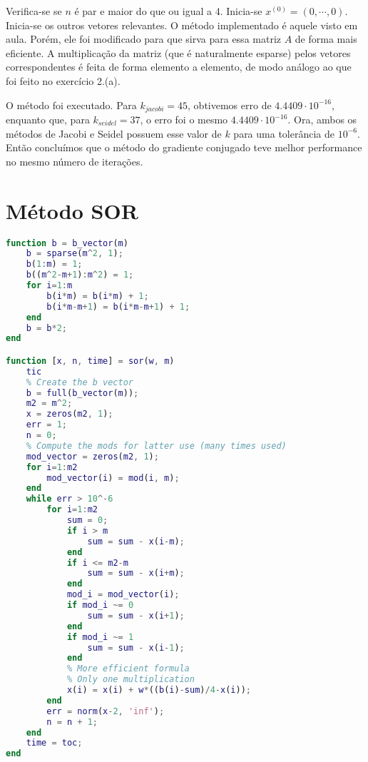 \documentclass{article}
\begin{document}
\begin{enumerate}
\begin{enumerate}
                    Verifica-se se $n$ é par e maior do que ou igual a 4.
                    Inicia-se $x^{(0)} = (0, \cdots, 0)$. Inicia-se os outros vetores
                    relevantes. O método implementado é aquele visto em aula.
                    Porém, ele foi modificado para que sirva para essa matriz $A$ de forma mais eficiente.
                    A multiplicação da matriz (que é naturalmente esparse) pelos vetores correspondentes é 
                    feita de forma elemento a elemento, de modo análogo ao que foi feito
                    no exercício 2.(a).

                    O método foi executado. Para $k_{jacobi} = 45$, obtivemos erro de $4.4409\cdot 10^{-16}$,
                    enquanto que, para $k_{seidel} = 37$, o erro foi o mesmo $4.4409\cdot 10^{-16}$. Ora, ambos os métodos
                    de Jacobi e Seidel possuem esse valor de $k$ para uma tolerância de $10^{-6}$. Então concluímos que
                    o método do gradiente conjugado teve melhor performance no mesmo número de iterações.
            \end{enumerate}

    \end{enumerate}

    \appendix

    \section{Método SOR}
        \label{appendix:a}

        \begin{lstlisting}[language=Matlab]
function b = b_vector(m)
    b = sparse(m^2, 1);
    b(1:m) = 1;
    b((m^2-m+1):m^2) = 1;
    for i=1:m
        b(i*m) = b(i*m) + 1;
        b(i*m-m+1) = b(i*m-m+1) + 1;
    end
    b = b*2;
end        

function [x, n, time] = sor(w, m)
    tic
    % Create the b vector
    b = full(b_vector(m));
    m2 = m^2;
    x = zeros(m2, 1);
    err = 1;
    n = 0;
    % Compute the mods for latter use (many times used)
    mod_vector = zeros(m2, 1);
    for i=1:m2
        mod_vector(i) = mod(i, m);
    end
    while err > 10^-6
        for i=1:m2
            sum = 0;
            if i > m
                sum = sum - x(i-m);
            end
            if i <= m2-m
                sum = sum - x(i+m);
            end
            mod_i = mod_vector(i);
            if mod_i ~= 0
                sum = sum - x(i+1);
            end
            if mod_i ~= 1
                sum = sum - x(i-1);
            end
            % More efficient formula
            % Only one multiplication
            x(i) = x(i) + w*((b(i)-sum)/4-x(i));
        end
        err = norm(x-2, 'inf');
        n = n + 1;
    end
    time = toc;
end

        \end{lstlisting}
\end{document}
